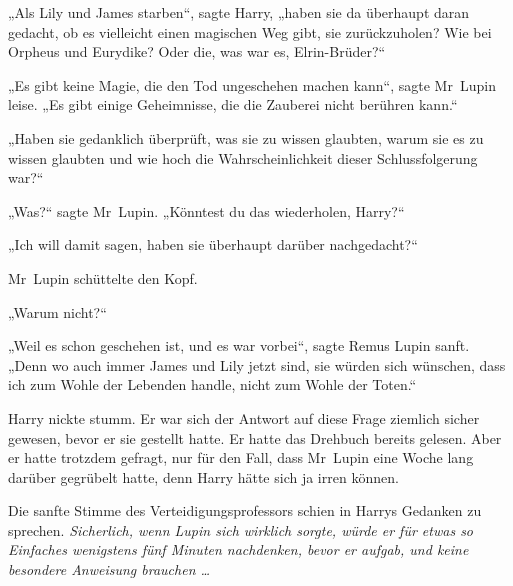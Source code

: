 „Als Lily und James starben“, sagte Harry, „haben sie da überhaupt daran gedacht, ob es vielleicht einen magischen Weg gibt, sie zurückzuholen? Wie bei Orpheus und Eurydike? Oder die, was war es, Elrin-Brüder?“

„Es gibt keine Magie, die den Tod ungeschehen machen kann“, sagte Mr~Lupin leise.
„Es gibt einige Geheimnisse, die die Zauberei nicht berühren kann.“

„Haben sie gedanklich überprüft, was sie zu wissen glaubten, warum sie es zu wissen glaubten und wie hoch die Wahrscheinlichkeit dieser Schlussfolgerung war?“

„Was?“ sagte Mr~Lupin.
„Könntest du das wiederholen, Harry?“

„Ich will damit sagen, haben sie überhaupt darüber nachgedacht?“

Mr~Lupin schüttelte den Kopf.

„Warum nicht?“

„Weil es schon geschehen ist, und es war vorbei“, sagte Remus Lupin sanft.
„Denn wo auch immer James und Lily jetzt sind, sie würden sich wünschen, dass ich zum Wohle der Lebenden handle, nicht zum Wohle der Toten.“

Harry nickte stumm. Er war sich der Antwort auf diese Frage ziemlich sicher gewesen, bevor er sie gestellt hatte. Er hatte das Drehbuch bereits gelesen. Aber er hatte trotzdem gefragt, nur für den Fall, dass Mr~Lupin eine Woche lang darüber gegrübelt hatte, denn Harry hätte sich ja irren können.

Die sanfte Stimme des Verteidigungsprofessors schien in Harrys Gedanken zu sprechen.
\emph{Sicherlich, wenn Lupin sich wirklich sorgte, würde er für etwas so Einfaches wenigstens fünf Minuten nachdenken, bevor er aufgab, und keine besondere Anweisung brauchen …}

